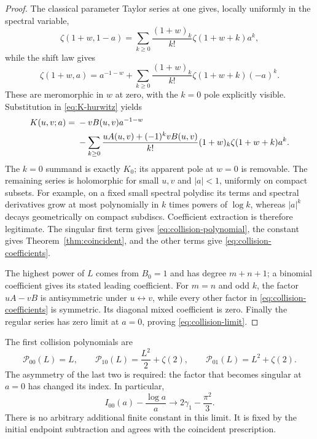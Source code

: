 \documentclass[11pt]{article}
\numberwithin{equation}{section}
\theoremstyle{definition}
\theoremstyle{remark}
\begin{document}
\begin{proof}
The classical parameter Taylor series at one gives, locally uniformly
in the spectral variable,
\[
 \zeta(1+w,1-a)=\sum_{k\ge0}\frac{(1+w)_k}{k!}
                      \zeta(1+w+k)a^k,
\]
while the shift law gives
\[
 \zeta(1+w,a)=a^{-1-w}
        +\sum_{k\ge0}\frac{(1+w)_k}{k!}\zeta(1+w+k)(-a)^k.
\]
These are meromorphic in $w$ at zero, with the $k=0$ pole explicitly
visible. Substitution in \eqref{eq:K-hurwitz} yields
\begin{align}
 K(u,v;a)={}&-vB(u,v)a^{-1-w}\notag\\
 &-\sum_{k\ge0}\frac{uA(u,v)+(-1)^kvB(u,v)}{k!}
                      (1+w)_k\zeta(1+w+k)a^k.
 \label{eq:K-collision}
\end{align}
The $k=0$ summand is exactly $K_0$; its apparent pole at $w=0$ is
removable. The remaining series is holomorphic for small $u,v$ and
$|a|<1$, uniformly on compact subsets. For example, on a fixed small
spectral polydisc its terms and spectral derivatives grow at most
polynomially in $k$ times powers of $\log k$, whereas $|a|^k$ decays
geometrically on compact subdiscs. Coefficient extraction is therefore
legitimate. The singular first term gives
\eqref{eq:collision-polynomial}, the constant gives
Theorem~\ref{thm:coincident}, and the other terms give
\eqref{eq:collision-coefficients}.

The highest power of $L$ comes from $B_0=1$ and has degree $m+n+1$;
a binomial coefficient gives its stated leading coefficient.
For $m=n$ and odd $k$, the factor
$uA-vB$ is antisymmetric under $u\leftrightarrow v$, while every other
factor in \eqref{eq:collision-coefficients} is symmetric. Its diagonal
mixed coefficient is zero. Finally the regular series has zero limit
at $a=0$, proving \eqref{eq:collision-limit}.
\end{proof}

The first collision polynomials are
\begin{equation}
 \mathcal P_{00}(L)=L,\qquad
 \mathcal P_{10}(L)=\frac{L^2}{2}+\zeta(2),\qquad
 \mathcal P_{01}(L)=L^2+\zeta(2).
 \label{eq:collision-examples}
\end{equation}
The asymmetry of the last two is required: the factor that becomes
singular at $a=0$ has changed its index. In particular,
\[
 I_{00}(a)-\frac{\log a}{a}\longrightarrow
                   2\gamma_1-\frac{\pi^2}{3}.
\]
There is no arbitrary additional finite constant in this limit. It is
fixed by the initial endpoint subtraction and agrees with the coincident
prescription.
\end{document}
